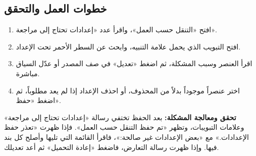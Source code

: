 \subsection{خطوات العمل والتحقق}
\begin{enumerate}
\item افتح «التنقل حسب العمل»، واقرأ عدد «إعدادات تحتاج إلى مراجعة».
\item افتح التبويب الذي يحمل علامة التنبيه، وابحث عن السطر الأحمر تحت الإعداد.
\item اقرأ العنصر وسبب المشكلة، ثم اضغط «تعديل» في صف المصدر أو عدّل السياق مباشرة.
\item اختر عنصراً موجوداً بدلاً من المحذوف، أو احذف الإعداد إذا لم يعد مطلوباً، ثم اضغط «حفظ».
\end{enumerate}

\textbf{تحقق ومعالجة المشكلة:} بعد الحفظ تختفي رسالة «إعدادات تحتاج إلى مراجعة» وعلامات التبويبات، وتظهر «تم حفظ التنقل حسب العمل». فإذا ظهرت «تعذر حفظ الإعدادات.» مع «بعض الإعدادات غير صالحة:»، فاقرأ القائمة التي تليها وأصلح كل بند فيها. وإذا ظهرت رسالة التعارض، فاضغط «إعادة التحميل» ثم أعد تعديلك.
